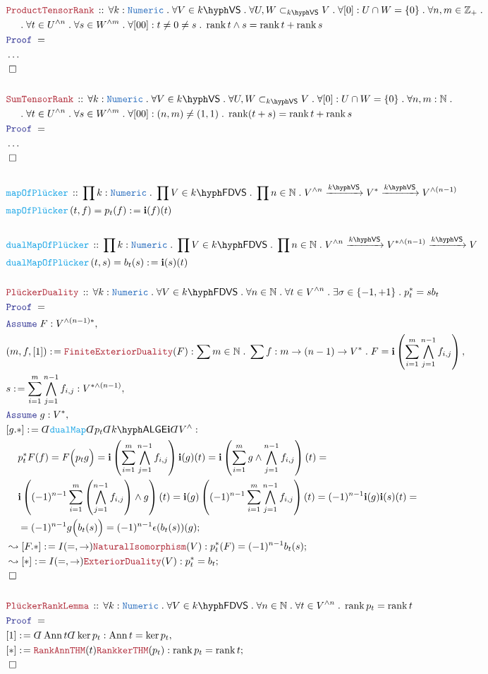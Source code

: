 \documentclass[12pt]{scrartcl}%
\newcommand{\TYPE}[1]{\textcolor{NavyBlue}{\mathtt{#1}}}%
\newcommand{\FUNC}[1]{\textcolor{Cerulean}{\mathtt{#1}}}%
\newcommand{\LOGIC}[1]{\textcolor{Blue}{\mathtt{#1}}}%
\newcommand{\THM}[1]{\textcolor{Maroon}{\mathtt{#1}}}%
\renewcommand{\.}{\; . \;} %
\newcommand{\de}{: \kern 0.1pc =} %
\newcommand{\Act}[1]{\left( #1 \right)} %
\newcommand{\Theorem}[2]{& \THM{#1} \, :: \, #2 \\ & \Proof = \\ } %
\newcommand{\DeclareFunc}[2]{& \FUNC{#1} \, :: \, #2 \\}%
\newcommand{\DefineNamedFunc}[4]{&  \FUNC{#1}\Act{#2} = #3 \de #4 \\}%
\newcommand{\NewLine}{\\ & \kern 1pc}%
\newcommand{\Page}[1]{ \begin{align*} #1 \end{align*}  }%
\newcommand{ \bd }{ \ByDef }%
\newcommand{\NoProof}{ & \ldots \\ \EndProof}%
\newcommand{\Int}{\mathbb{Z}}%
\newcommand{\Nat}{\mathbb{N}}%
\newcommand{\Say}[3]{& #1 \de #2 : #3, \\} %
\newcommand{\Conclude}[3]{& #1 \de #2 : #3; \\}%
\newcommand{\DeriveConclude}[3]{& \leadsto #1 \de #2 : #3 ; \\} %
\newcommand{\Assume}[2]{& \LOGIC{Assume} \; #1 : #2, \\} %
\newcommand{\QED}{\; \square} %
\newcommand{\EndProof}{& \QED \\} %
\newcommand{\ByDef}{\rotatebox[origin=c]{-180}{$D$}}%
\newcommand{\Proof}{\LOGIC{Proof} \; } %
\newcommand{\Arrow}[1]{\xrightarrow{#1}}%
\DeclareMathOperator{\rank}{rank} %
\newcommand{\subvec}[1]{\subset_{\VS{#1}}}%
\DeclareMathOperator{\Ann}{Ann}   %
\newcommand{\VS}[1]{#1\hyph\mathsf{VS}} %
\newcommand{\FDVS}[1]{#1\hyph\mathsf{FDVS}} %
\newcommand{\LALGE}[1]{#1\hyph\mathsf{ALGE}}%
\begin{document}
\Page{
	\Theorem{ProductTensorRank}
	{
		\forall k : \TYPE{Numeric} \.
		\forall V \in \VS{k} \.
		\forall U,W \subvec{k} V \.
		\forall [0] : U \cap W = \{0\} \.
		\forall n,m \in \Int_+ \.
		\NewLine \.
		\forall t \in U^{\wedge n} \.
		\forall s \in W^{\wedge m} \.
		\forall [00] : t \neq 0 \neq s \.
		\rank t \wedge s = \rank t + \rank s
	}
	\NoProof
	\\
	\Theorem{SumTensorRank}
	{
		\forall k : \TYPE{Numeric} \.
		\forall V \in \VS{k} \.
		\forall U,W \subvec{k} V \.
		\forall [0] : U \cap W = \{0\} \.
		\forall n,m  : \Nat   \.
		\NewLine \.
		\forall t \in U^{\wedge n} \.
		\forall s \in W^{\wedge m} \.
		\forall [00] : (n,m) \neq (1,1) \. 
		\rank (t + s) = \rank t + \rank s
	}
	\NoProof
	\\
	\DeclareFunc{mapOfPl\ddot{u}cker}
	{
		\prod k : \TYPE{Numeric} \.
		\prod V \in \FDVS{k} \.
		\prod n \in \Nat \.
		V^{\wedge n} \Arrow{\VS{k}} V^* \Arrow{\VS{k}} 
		V^{\wedge(n-1)}
	}
	\DefineNamedFunc{mapOfPl\ddot{u}cker}{t,f}{p_t(f)}
	{ \mathbf{i}(f)(t) }
	\\
	\DeclareFunc{dualMapOfPl\ddot{u}cker}
	{
		\prod k : \TYPE{Numeric} \.
		\prod V \in \FDVS{k} \.
		\prod n \in \Nat \.
		V^{\wedge n} \Arrow{\VS{k}} 
		V^{*\wedge(n -1) } \Arrow{\VS{k}} V
	}
	\DefineNamedFunc{dualMapOfPl\ddot{u}cker}{t,s}{b_t(s)}
	{ \mathbf{i}(s)(t) }
	\\
	\Theorem{Pl\ddot{u}ckerDuality}
	{
		\forall k : \TYPE{Numeric} \.
		\forall V \in \FDVS{k} \.
		\forall n \in \Nat \.
		\forall t \in V^{\wedge n}  \. 
		\exists \sigma \in \{-1,+1\} \. 
		p^*_t = sb_t
	}
	\Assume{F}{V^{\wedge(n-1)*}}
	\Say{(m,f,[1])}{\THM{FiniteExteriorDuality}(F)}
	{
		\sum m \in \Nat \.
		\sum f : m \to (n-1) \to V^* \.
		F = 
		\mathbf{i}\left(\sum^m_{i=1} \bigwedge^{n-1}_{j=1} f_{i,j}
		\right)
	}
	\Say{s}{\sum^m_{i=1} \bigwedge^{n-1}_{j=1} f_{i,j}}
	{V^{*\wedge(n-1)}}
	\Assume{g}{V^*}
	\Conclude{[g.*]}{
		\bd \FUNC{dualMap}
		\bd p_t
		\bd \LALGE{k} \mathbf{i}
		\bd V^\wedge
	}
	{
		\NewLine
		p^*_t F(f) =
		F\Big( p_t g  \Big) =
		\mathbf{i}\left(\sum^m_{i=1} \bigwedge^{n-1}_{j=1} f_{i,j}
		\right)
		\mathbf{i}(g)(t) = 
		\mathbf{i}\left(\sum^m_{i=1} g \wedge \bigwedge^{n-1}_{j=1} 
		f_{i,j} 
		\right)
		(t) = \NewLine 
		\mathbf{i}\left((-1)^{n-1} 
			\sum^m_{i=1} \left(\bigwedge^{n-1}_{j=1} 
			f_{i,j} \right) \wedge g
		\right)
		(t) = 
		\mathbf{i}(g)\left((-1)^{n-1}
			\sum^m_{i=1} \bigwedge^{n-1}_{j=1} 
			f_{i,j} 
		\right)
		(t) = 
		(-1)^{n-1}\mathbf{i}(g)\mathbf{i}(s)(t) = \NewLine = 
		(-1)^{n-1} g\Big(b_t(s)\Big) =
		(-1)^{n-1} \epsilon(b_t(s))(g)
	}
	\DeriveConclude{[F.*]}{I(=,\to)\THM{NaturalIsomorphism}(V) }
	{
		p^*_t(F) = (-1)^{n-1} b_t(s)
	}
	\DeriveConclude{[*]}{I(=,\to)\THM{ExteriorDuality}(V)}
	{
		p^*_t = b_t
	}
	\EndProof
	\\
	\Theorem{Pl\ddot{u}ckerRankLemma}
	{
		\forall k : \TYPE{Numeric} \.
		\forall V \in \FDVS{k} \.
		\forall n \in \Nat \.
		\forall t \in V^{\wedge n} \.
		\rank p_t = \rank t
	}
	\Say{[1]}{\bd \Ann t \bd \ker p_t}
	{
		\Ann t = \ker p_t
	}
	\Conclude{[*]}
	{     
		\THM{RankAnnTHM}(t)
		\THM{RankkerTHM}(p_t)
	}
	{
		\rank p_t = \rank t
	}
	\EndProof
}
\end{document}
